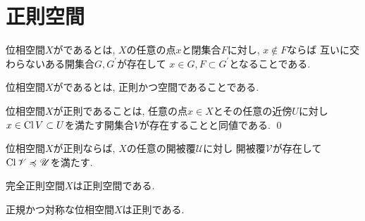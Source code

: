 \documentclass[uplatex, dvipdfmx, a4paper, 12pt, class=jsbook, crop=false]{standalone}
\begin{document}
\section{正則空間}
\label{sec:regular-spaces}

\begin{definition}
	位相空間$ X $がであるとは,
	$ X $の任意の点$ x $と閉集合$ F $に対し,
	$ x \not\in F $ならば
	互いに交わらないある開集合$ G, G^\prime $が存在して
	$ x \in G, F \subset G^\prime $となることである.
\end{definition}

\begin{definition}
	位相空間$ X $がであるとは,
	正則かつ空間であることである.
\end{definition}

\begin{proposition}
	\label{prop:A property equivalent to regularity}
	位相空間$ X $が正則であることは,
	任意の点$ x \in X $とその任意の近傍$ U $に対し
	$ x \in \mathop{\mathrm{Cl}}\nolimits{V} \subset U $を満たす開集合$ V $が存在することと同値である.
	\qed
\end{proposition}

\begin{corollary}
	位相空間$ X $が正則ならば,
	$ X $の任意の開被覆$\mathscr{U}$に対し
	開被覆$\mathscr{V}$が存在して
	$\mathop{\mathrm{Cl}}\nolimits \mathscr{V} \preccurlyeq \mathscr{U}$を満たす.
\end{corollary}

\begin{proposition}
	完全正則空間$ X $は正則空間である.
\end{proposition}

\begin{proposition}
	正規かつ対称な位相空間$ X $は正則である.
\end{proposition}
\end{document}
